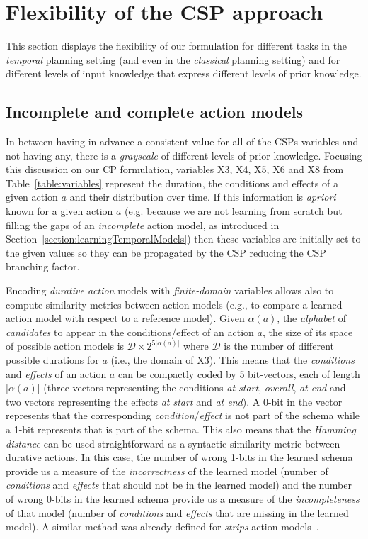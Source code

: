 \documentclass{ecai}
\begin{document}
\section{Flexibility of the CSP approach}
\label{sec:usingCPValidation}
This section displays the flexibility of our formulation for different tasks in the {\em temporal} planning setting (and even in the {\em classical} planning setting) and for different levels of input knowledge that express different levels of prior knowledge.

\subsection{Incomplete and complete action models}
In between having in advance a consistent value for all of the CSPs variables and not having any, there is a {\em grayscale} of different levels of prior knowledge. Focusing this discussion on our CP formulation, variables X3, X4, X5, X6 and X8 from Table~\ref{table:variables} represent the duration, the conditions and effects of a given action $a$ and their distribution over time. If this information is {\em apriori} known for a given action $a$ (e.g. because we are not learning from scratch but filling the gaps of an {\em incomplete} action model, as introduced in Section~\ref{section:learningTemporalModels}) then these variables are initially set to the given values so they can be propagated by the CSP reducing the CSP branching factor. 

Encoding {\em durative action} models with {\em finite-domain} variables allows also to compute similarity metrics between action models (e.g., to compare a learned action model with respect to a reference model). Given $\alpha(a)$, the {\em alphabet} of {\em candidates} to appear in the conditions/effect of an action $a$, the size of its space of possible action models is $\mathcal{D}\times 2^{5|\alpha(a)|}$ where $\mathcal{D}$ is the number of different possible durations for $a$ (i.e., the domain of X3). This means that the {\em conditions} and {\em effects} of an action $a$ can be compactly coded by 5 bit-vectors, each of length $|\alpha(a)|$ (three vectors representing the conditions {\em at start}, {\em overall}, {\em at end} and two vectors representing the effects {\em at start} and {\em at end}). A 0-bit in the vector represents that the corresponding {\em condition}/{\em effect} is not part of the schema while a 1-bit represents that is part of the schema. This also means that the {\em Hamming distance} can be used straightforward as a syntactic similarity metric between durative actions. In this case, the number of wrong 1-bits in the learned schema provide us a measure of the {\em incorrectness} of the learned model (number of {\em conditions} and {\em effects} that should not be in the learned model) and the number of wrong 0-bits in the learned schema provide us a measure of the {\em incompleteness} of that model (number of {\em conditions} and {\em effects} that are missing in the learned model). A similar method was already defined for {\em strips} action models~\cite{aineto2019model}. 
\end{document}
